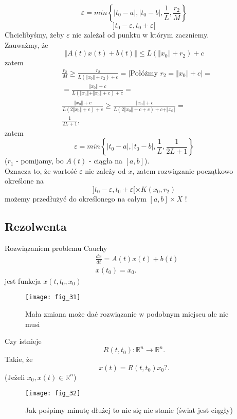 \documentclass[../main.tex]{subfiles}
\begin{document}
\[
    \varepsilon = min \left\{ |t_0-a|,|t_0-b|,\frac{1}{L},\frac{r_2}{M} \right\}
\]
\[
    ]t_0-\varepsilon,t_0+\varepsilon[
\]
Chcielibyśmy, żeby $\varepsilon$ nie zależał od punktu w którym zaczniemy.\\
Zauważmy, że
\[
    \Vert  A(t)x(t)+b(t)  \Vert \le L(\Vert x_0\Vert +r_2 ) +c
\]
zatem
\begin{align*}
    &\frac{r_2}{M} \ge \frac{r_2}{L(\Vert x_0 \Vert +r_2)+c}= \Bigg| \text{Połóżmy }r_2 = \Vert x_0 \Vert +c \Bigg| =\\
    &= \frac{\Vert x_0 \Vert +c}{L(\Vert x_0 \Vert +\Vert x_0 \Vert +c)+c}=\\
    &\frac{\Vert x_0 \Vert +c}{L(2\Vert x_0 \Vert +c)+c}\ge \frac{\Vert x_0 \Vert +c}{L(2\Vert x_0 \Vert +c+c) + c + \Vert x_0 \Vert } = \\
    &\frac{1}{2L+1},
\end{align*}
zatem
\[
    \varepsilon = min \left\{ |t_0-a|,|t_0-b|,\frac{1}{L},\frac{1}{2L+1} \right\}
\]
($r_1$ - pomijamy, bo $A(t)$ -  ciągła na $[a,b]$).\\
Oznacza to, że wartość $\varepsilon$ nie zależy od $x$, zatem rozwiązanie początkowo określone na
\[
    ]t_0-\varepsilon,t_0+\varepsilon[ \times K(x_0,r_2)
\]
możemy przedłużyć do określonego na całym $[a,b] \times X$ !

    \subsection{Rezolwenta}
    Rozwiązaniem problemu Cauchy
    \begin{align*}
        &\frac{dx}{dt} = A(t)x(t)+b(t)\\
        &x(t_0)=x_0
    .\end{align*}
    jest funkcja $x(t,t_0,x_0)$
\begin{figure}
    \centering
    \texttt{[image: fig\_31]}
    \caption{Mała zmiana może dać rozwiązanie w podobnym miejscu ale nie musi}
    \label{fig:fig_31}
\end{figure}

\begin{pytanie}
    Czy istnieje
    \[
        R(t,t_0): \mathbb{R}^n\to\mathbb{R}^n
    .\] Takie, że
    \[
        x(t) = R(t,t_0)x_0?
    .\](Jeżeli $x_0,x(t)\in\mathbb{R}^n$)
\end{pytanie}

\begin{figure}
    \centering
    \texttt{[image: fig\_32]}
    \caption{Jak pośpimy minutę dłużej to nic się nie stanie (świat jest ciągły)}
    \label{fig:fig_32}
\end{figure}
\end{document}
